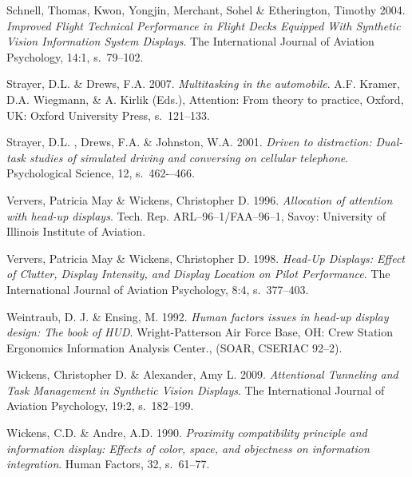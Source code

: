 \documentclass[utf8,bachelor,manualbib]{gradu3}
\begin{document}
\begin{thebibliography}{}
Schnell, Thomas,  Kwon, Yongjin, Merchant, Sohel \& Etherington, Timothy 2004.
\textit{Improved Flight Technical Performance in Flight Decks Equipped With Synthetic Vision Information System Displays}.
The International Journal of Aviation Psychology, 14:1, s.~79--102.

Strayer, D.L. \& Drews, F.A. 2007.
\textit{Multitasking in the automobile}.
A.F. Kramer, D.A. Wiegmann, \& A. Kirlik (Eds.), Attention: From theory to practice, Oxford, UK: Oxford University Press, s.~121--133.

Strayer, D.L. , Drews, F.A. \& Johnston, W.A. 2001.
\textit{Driven to distraction: Dual-task studies of simulated
driving and conversing on cellular telephone}.
Psychological Science, 12, s.~462-–466.

Ververs, Patricia May \& Wickens, Christopher D. 1996.
\textit{Allocation of attention with head-up displays}.
Tech. Rep. ARL–96–1/FAA–96–1, Savoy: University of Illinois Institute of Aviation.

Ververs, Patricia May \& Wickens, Christopher D. 1998.
\textit{Head-Up Displays: Effect of Clutter, Display Intensity, and Display Location on Pilot Performance}.
The International Journal of Aviation Psychology, 8:4, s.~377--403.

Weintraub, D. J. \& Ensing, M. 1992.
\textit{Human factors issues in head-up display design: The book of
HUD}.
Wright-Patterson Air Force Base, OH: Crew Station Ergonomics
Information Analysis Center., (SOAR, CSERIAC 92–2).

Wickens, Christopher D. \& Alexander, Amy L. 2009.
\textit{Attentional Tunneling and Task Management in Synthetic Vision Displays}.
The International Journal of Aviation Psychology, 19:2, s.~182--199.

Wickens, C.D. \& Andre, A.D. 1990.
\textit{Proximity compatibility principle and information display: Effects
of color, space, and objectness on information integration}.
Human Factors, 32, s.~61--77.


\end{thebibliography}
\end{document}
